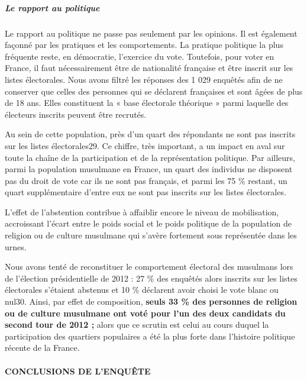 \hypertarget{le-rapport-au-politique}{%
\subparagraph{Le rapport au politique}\label{le-rapport-au-politique}}


Le rapport au politique ne passe pas seulement par les opinions. Il est
également façonné par les pratiques et les comportements. La pratique
politique la plus fréquente reste, en démocratie, l'exercice du vote.
Toutefois, pour voter en France, il faut nécessairement être de
nationalité française et être inscrit sur les listes électorales. Nous
avons filtré les réponses des 1 029 enquêtés afin de ne conserver que
celles des personnes qui se déclarent françaises et sont âgées de plus
de 18 ans. Elles constituent la « base électorale théorique » parmi
laquelle des électeurs inscrits peuvent être recrutés.



Au sein de cette population, près d'un quart des répondants ne sont pas
inscrits sur les listes électorales29. Ce chiffre, très important, a un
impact en aval sur toute la chaîne de la participation et de la
représentation politique. Par ailleurs, parmi la population musulmane en
France, un quart des individus ne disposent pas du droit de vote car ils
ne sont pas français, et parmi les 75 \% restant, un quart
supplémentaire d'entre eux ne sont pas inscrits sur les listes
électorales.

L'effet de l'abstention contribue à affaiblir encore le niveau de
mobilisation, accroissant l'écart entre le poids social et le poids
politique de la population de religion ou de culture musulmane qui
s'avère fortement sous représentée dans les urnes.

Nous avons tenté de reconstituer le comportement électoral des musulmans
lors de l'élection présidentielle de 2012 : 27 \% des enquêtés alors
inscrits sur les listes électorales s'étaient abstenus et 10 \%
déclarent avoir choisi le vote blanc ou nul30. Ainsi, par effet de
composition, \textbf{seuls 33 \% des personnes de religion ou de culture
musulmane ont voté pour l'un des deux candidats du second tour de 2012
;} alors que ce scrutin est celui au cours duquel la participation des
quartiers populaires a été la plus forte dans l'histoire politique
récente de la France.


\hypertarget{conclusions-de-lenquuxeate}{%
\paragraph{CONCLUSIONS DE L'ENQUÊTE}\label{conclusions-de-lenquuxeate}}


